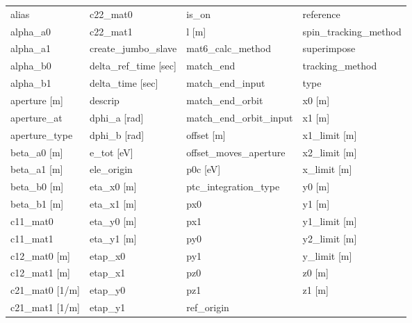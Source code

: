  \begin{tabular}{llll} \toprule
alias                            & c22_mat0                         & is_on                            & reference                        \\
alpha_a0                         & c22_mat1                         & l [m]                            & spin_tracking_method             \\
alpha_a1                         & create_jumbo_slave               & mat6_calc_method                 & superimpose                      \\
alpha_b0                         & delta_ref_time [sec]             & match_end                        & tracking_method                  \\
alpha_b1                         & delta_time [sec]                 & match_end_input                  & type                             \\
aperture [m]                     & descrip                          & match_end_orbit                  & x0 [m]                           \\
aperture_at                      & dphi_a [rad]                     & match_end_orbit_input            & x1 [m]                           \\
aperture_type                    & dphi_b [rad]                     & offset [m]                       & x1_limit [m]                     \\
beta_a0 [m]                      & e_tot [eV]                       & offset_moves_aperture            & x2_limit [m]                     \\
beta_a1 [m]                      & ele_origin                       & p0c [eV]                         & x_limit [m]                      \\
beta_b0 [m]                      & eta_x0 [m]                       & ptc_integration_type             & y0 [m]                           \\
beta_b1 [m]                      & eta_x1 [m]                       & px0                              & y1 [m]                           \\
c11_mat0                         & eta_y0 [m]                       & px1                              & y1_limit [m]                     \\
c11_mat1                         & eta_y1 [m]                       & py0                              & y2_limit [m]                     \\
c12_mat0 [m]                     & etap_x0                          & py1                              & y_limit [m]                      \\
c12_mat1 [m]                     & etap_x1                          & pz0                              & z0 [m]                           \\
c21_mat0 [1/m]                   & etap_y0                          & pz1                              & z1 [m]                           \\
c21_mat1 [1/m]                   & etap_y1                          & ref_origin                       &                                  \\
 \bottomrule
 \end{tabular}
